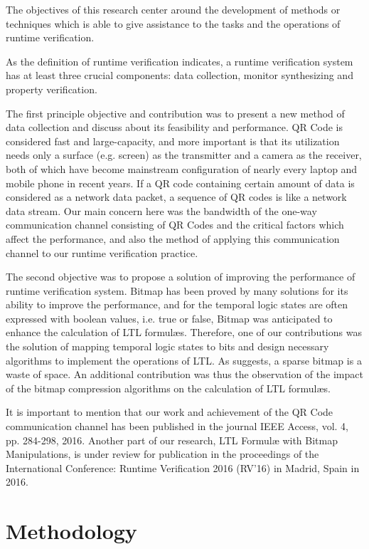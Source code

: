 The objectives of this research center around the development of methods or techniques which is able to give assistance to the tasks and the operations of runtime verification.

As the definition of runtime verification indicates, a runtime verification system has at least three crucial components: data collection, monitor synthesizing and property verification. 

The first principle objective and contribution was to present a new method of data collection and discuss about its feasibility and performance. QR Code is considered fast and large-capacity, and more important is that its utilization needs only a surface (e.g. screen) as the transmitter and a camera as the receiver, both of which have become mainstream configuration of nearly every laptop and mobile phone in recent years. If a QR code containing certain amount of data is considered as a network data packet, a sequence of QR codes is like a network data stream. Our main concern here was the bandwidth of the one-way communication channel consisting of QR Codes and the critical factors which affect the performance, and also the method of applying this communication channel to our runtime verification practice.

The second objective was to propose a solution of improving the performance of runtime verification system. Bitmap has been proved by many solutions for its ability to improve the performance, and for the temporal logic states are often expressed with boolean values, i.e. true or false, Bitmap was anticipated to enhance the calculation of LTL formul\ae{}s. Therefore, one of our contributions was the solution of mapping temporal logic states to bits and design necessary algorithms to implement the operations of LTL. As \cite{lemire2014} suggests, a sparse bitmap is a waste of space. An additional contribution was thus the observation of the impact of the bitmap compression algorithms on the calculation of LTL formul\ae{}s.

It is important to mention that our work and achievement of the QR Code communication channel has been published in the journal IEEE Access, vol. 4, pp. 284-298, 2016. Another part of our research, LTL Formul\ae{} with Bitmap Manipulations, is under review for publication in the proceedings of the International Conference: Runtime Verification 2016 (RV'16) in Madrid, Spain in 2016.

\section{Methodology}

